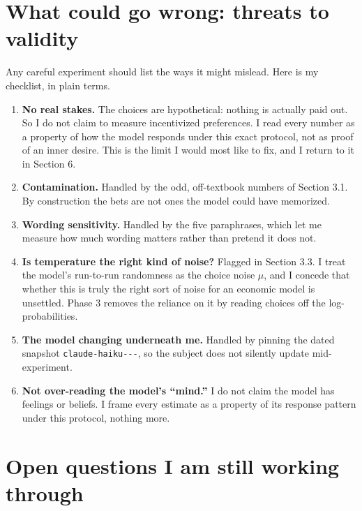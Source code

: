 \documentclass[11pt]{article}
\begin{document}
\section{What could go wrong: threats to validity}

Any careful experiment should list the ways it might mislead. Here is my checklist, in plain terms.

\begin{enumerate}[leftmargin=1.5em]
\item \textbf{No real stakes.} The choices are hypothetical: nothing is actually paid out. So I do not
claim to measure incentivized preferences. I read every number as a property of how the model responds
under this exact protocol, not as proof of an inner desire. This is the limit I would most like to fix,
and I return to it in Section 6.
\item \textbf{Contamination.} Handled by the odd, off-textbook numbers of Section 3.1. By construction the
bets are not ones the model could have memorized.
\item \textbf{Wording sensitivity.} Handled by the five paraphrases, which let me measure how much wording
matters rather than pretend it does not.
\item \textbf{Is temperature the right kind of noise?} Flagged in Section 3.3. I treat the model's
run-to-run randomness as the choice noise $\mu$, and I concede that whether this is truly the right sort
of noise for an economic model is unsettled. Phase 3 removes the reliance on it by reading choices off the
log-probabilities.
\item \textbf{The model changing underneath me.} Handled by pinning the dated snapshot
\texttt{claude-\allowbreak haiku---}, so the subject does not silently update mid-experiment.
\item \textbf{Not over-reading the model's ``mind.''} I do not claim the model has feelings or beliefs. I
frame every estimate as a property of its response pattern under this protocol, nothing more.
\end{enumerate}

\section{Open questions I am still working through}
\end{document}
